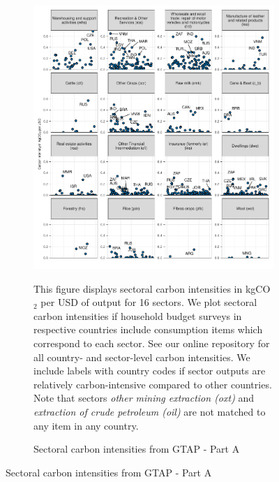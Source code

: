 \begin{figure}[ht!]
  \centering
  \caption{Sectoral carbon intensities from GTAP} \label{fig:GTAP}\label{fig:B}
  \begin{subfigure}[b]{\textwidth}
  \centering
  \caption{Sectoral carbon intensities from GTAP - Part A} \label{fig:B1}  \includegraphics{Analysis_Carbon_Intensities_GTAP/Figure_2.1.1_A_2017B}
  \begin{subcaption2}
    This figure displays sectoral carbon intensities in kgCO$_{2}$ per USD of output for 16 sectors. We plot sectoral carbon intensities if household budget surveys in respective countries include consumption items which correspond to each sector. See our online repository for all country- and sector-level carbon intensities. We include labels with country codes if sector outputs are relatively carbon-intensive compared to other countries. Note that sectors \textit{other mining extraction (oxt)} and \textit{extraction of crude petroleum (oil)} are not matched to any item in any country.
  \end{subcaption2}
\end{subfigure}
\end{figure}

\clearpage

